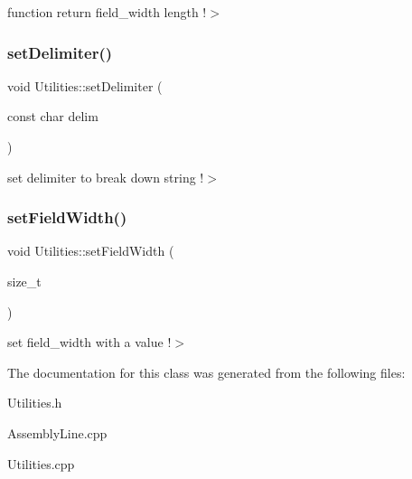 function return field\+\_\+width length !$>$ \mbox{\label{class_utilities_a6961ff17f2a37332cff6ef51940b9c7b}} 
\subsubsection{\texorpdfstring{set\+Delimiter()}{setDelimiter()}}
{\footnotesize\ttfamily void Utilities\+::set\+Delimiter (\begin{DoxyParamCaption}\item[{const char}]{delim }\end{DoxyParamCaption})\hspace{0.3cm}{\ttfamily [static]}}

set delimiter to break down string !$>$ \mbox{\label{class_utilities_ac988cf9fa28095c6e5e478364a7115af}} 
\subsubsection{\texorpdfstring{set\+Field\+Width()}{setFieldWidth()}}
{\footnotesize\ttfamily void Utilities\+::set\+Field\+Width (\begin{DoxyParamCaption}\item[{size\+\_\+t}]{ }\end{DoxyParamCaption})}

set field\+\_\+width with a value !$>$ 

The documentation for this class was generated from the following files\+:\begin{DoxyCompactItemize}
\item 
Utilities.\+h\item 
Assembly\+Line.\+cpp\item 
Utilities.\+cpp\end{DoxyCompactItemize}
